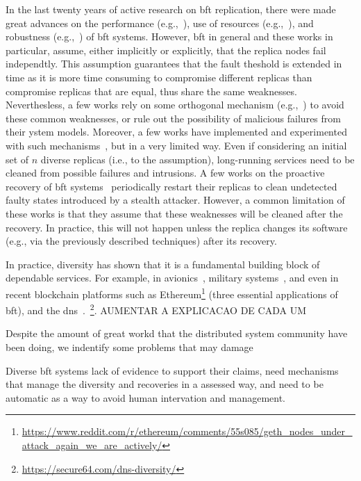In the last twenty years of active research on \gls{bft} replication, there were made great advances on the performance (e.g.,~\cite{Kotla:2010,Aublin:2015,Behl:2015}), use of resources (e.g.,~\cite{Yin:2003,Wood:2011,Veronese:2013,Liu:2016,Behl:2017}), and robustness (e.g.,~\cite{Amir:2011,Bessani:2014,Clement:2009b}) of \gls{bft} systems.
However, \gls{bft} in general and these works in particular, assume, either implicitly or explicitly, that the replica nodes fail independtly. 
This assumption guarantees that the fault theshold is extended in time as it is more time consuming to compromise different replicas than compromise replicas that are equal, thus share the same weaknesses.
Neverthesless, a few works rely on some orthogonal mechanism (e.g.,~\cite{Roeder:2010,Chen:1995}) to avoid these common weaknesses, or rule out the possibility of malicious failures from their ystem models.
Moreover, a few works have implemented and experimented with such mechanisms~\cite{Rodrigues:2001,Roeder:2010,Amir:2011}, but in a very limited way.
Even if considering an initial set of $n$ diverse replicas (i.e., to the assumption), long-running services need to be cleaned from possible failures and intrusions.
A few works on the proactive recovery of \gls{bft} systems~\cite{Castro:2002,Sousa:2010,Roeder:2010,Platania:2014,Distler:2011} periodically restart their replicas to clean undetected faulty states introduced by a stealth attacker. 
However, a common limitation of these works is that they assume that these weaknesses will be cleaned after the recovery.
In practice, this will not happen unless the replica changes its software (e.g., via the previously described techniques) after its recovery.




In practice, diversity has shown that it is a fundamental building block of dependable services.
For example, in avionics~\cite{Yeh:2004}, military systems~\cite{rhimes}, and even in recent blockchain platforms such as Ethereum\footnote{\url{https://www.reddit.com/r/ethereum/comments/55s085/geth_nodes_under_attack_again_we_are_actively/}} (three essential applications of \gls{bft}), and the \gls{dns}~\cite{Shue:2013}.~\footnote{\url{https://secure64.com/dns-diversity/}}. 
AUMENTAR A EXPLICACAO DE CADA UM 



Despite the amount of great workd that the distributed system community have been doing, we indentify some problems that may damage 


Diverse \gls{bft} systems lack of evidence to support their claims, need mechanisms that manage the diversity and recoveries in a assessed way, and need to be automatic as a way to avoid human intervation and management. 

